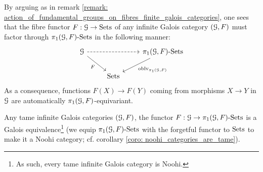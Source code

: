                 \begin{remark} \label{remark: action_of_fundamental_groups_on_fibres_infinite_galois_categories}
                    By arguing as in remark \ref{remark: action_of_fundamental_groups_on_fibres_finite_galois_categories}, one sees that the fibre functor $F: \mathcal{G} \to \mathrm{Sets}$ of any infinite Galois category $(\mathcal{G}, F)$ must factor through $\pi_1(\mathcal{G}, F)\text{-}\mathrm{Sets}$ in the following manner:
                        $$
                            \begin{tikzcd}
                            	\calG && {\pi_1(\calG, F)\-\Sets} \\
                            	& \Sets
                            	\arrow[dashed, from=1-1, to=1-3]
                            	\arrow["F"', from=1-1, to=2-2]
                            	\arrow["{\oblv_{\pi_1(\calG, F)}}", from=1-3, to=2-2]
                            \end{tikzcd}
                        $$
                    As a consequence, functions $F(X) \to F(Y)$ coming from morphisms $X \to Y$ in $\mathcal{G}$ are automatically $\pi_1(\mathcal{G}, F)$-equivariant. 
                \end{remark}
                \begin{theorem} \label{theorem: infinite_categorical_galois_correspondence}
                    \cite[Theorem 7.2.5(3)]{bhatt_scholze_2014_pro_etale} Any tame infinite Galois categories $(\mathcal{G}, F)$, the functor $F: \mathcal{G} \to \pi_1(\mathcal{G}, F)\text{-}\mathrm{Sets}$ is a Galois equivalence\footnote{As such, every tame infinite Galois category is Noohi.} (we equip $\pi_1(\mathcal{G}, F)\text{-}\mathrm{Sets}$ with the forgetful functor to $\mathrm{Sets}$ to make it a Noohi category; cf. corollary \ref{coro: noohi_categories_are_tame}).
                \end{theorem}

